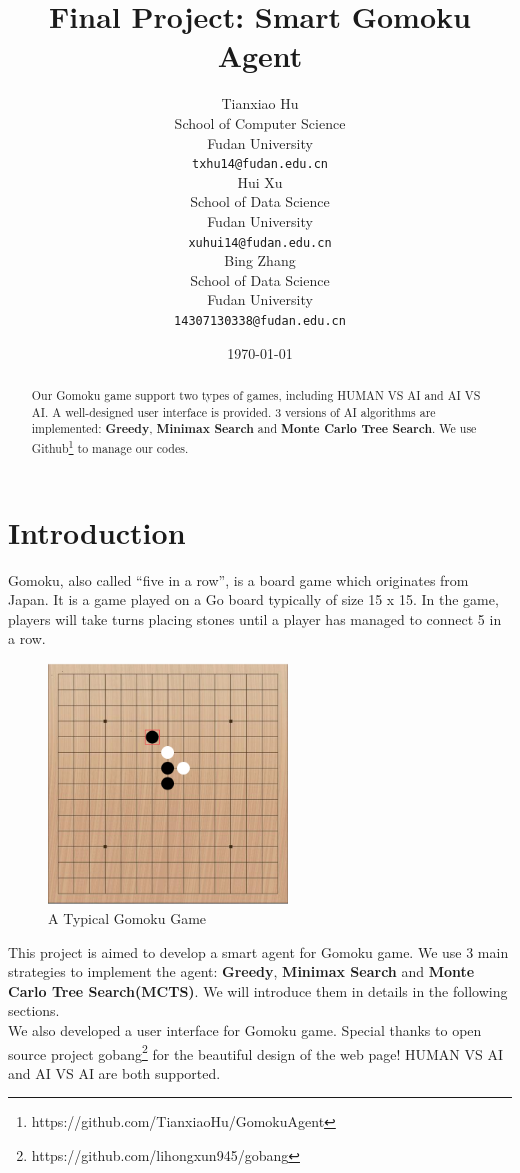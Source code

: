 \documentclass[12pt,a4paper]{article}
\title{Final Project: Smart Gomoku Agent}
\author{Tianxiao Hu \\
  School of Computer Science\\
  Fudan University\\
  {\tt txhu14@fudan.edu.cn} \\\And
  Hui Xu \\
  School of Data Science\\
  Fudan University\\
  {\tt xuhui14@fudan.edu.cn} \\\And
  Bing Zhang \\
  School of Data Science\\
  Fudan University\\
  {\tt 14307130338@fudan.edu.cn}
}
\date{\today}
\begin{document}
\maketitle
\begin{abstract}
Our Gomoku game support two types of games, including HUMAN VS AI and AI VS AI. A well-designed user interface is provided. 3 versions of AI algorithms are implemented: \textbf{Greedy}, \textbf{Minimax Search} and \textbf{Monte Carlo Tree Search}. We use Github\footnote{https://github.com/TianxiaoHu/GomokuAgent} to manage our codes.

\end{abstract}

\section{Introduction}
Gomoku, also called ``five in a row'', is a board game which originates from Japan. It is a game played on a Go board typically of size 15 x 15. In the game, players will take turns placing stones until a player has managed to connect 5 in a row.

\begin{figure}[!h]
\centering\includegraphics[width=2.5in]{2.png}
\caption{A Typical Gomoku Game}
\end{figure}

This project is aimed to develop a smart agent for Gomoku game. We use 3 main strategies to implement the agent: \textbf{Greedy}, \textbf{Minimax Search} and \textbf{Monte Carlo Tree Search(MCTS)}. We will introduce them in details in the following sections.\\
We also developed a user interface for Gomoku game. Special thanks to open source project gobang\footnote{https://github.com/lihongxun945/gobang} for the beautiful design of the web page! HUMAN VS AI and AI VS AI are both supported.
\end{document}
